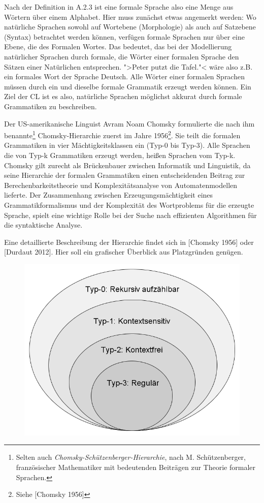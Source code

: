 \documentclass[12pt,a4paper]{article}
\theoremstyle{definition}
\begin{document}
		Nach der Definition in A.2.3 ist eine formale Sprache also eine Menge aus Wörtern über einem Alphabet. Hier muss zunächst etwas angemerkt werden: Wo natürliche Sprachen sowohl auf Wortebene (Morphologie) als auch auf Satzebene (Syntax) betrachtet werden können, verfügen formale Sprachen nur über eine Ebene, die des Formalen Wortes. Das bedeutet, das bei der Modellierung natürlicher Sprachen durch formale, die Wörter einer formalen Sprache den Sätzen einer Natürlichen entsprechen. ">Peter putzt die Tafel."< wäre also z.B. ein formales Wort der Sprache Deutsch. Alle Wörter einer formalen Sprachen müssen durch ein und dieselbe formale Grammatik erzeugt werden können. Ein Ziel der CL ist es also, natürliche Sprachen möglichst akkurat durch formale Grammatiken zu beschreiben.

		Der US-amerikanische Linguist Avram Noam Chomsky formulierte die nach ihm benannte\footnote{Selten auch \emph{Chomsky-Schützenberger-Hierarchie}, nach M. Schützenberger, französischer Mathematiker mit bedeutenden Beiträgen zur Theorie formaler Sprachen.} Chomsky-Hierarchie zuerst im Jahre 1956\footnote{Siehe [Chomsky 1956]}. Sie teilt die formalen Grammatiken in vier Mächtigkeitsklassen ein (Typ-0 bis Typ-3). Alle Sprachen die von Typ-k Grammatiken erzeugt werden, heißen Sprachen vom Typ-k. Chomsky gilt zurecht als Brückenbauer zwischen Informatik und Linguistik, da seine Hierarchie der formalen Grammatiken einen entscheidenden Beitrag zur Berechenbarkeitstheorie und Komplexitätsanalyse von Automatenmodellen lieferte. Der Zusammenhang zwischen Erzeugungsmächtigkeit eines Grammatikformalismus und der Komplexität des Wortproblems für die erzeugte Sprache, spielt eine wichtige Rolle bei der Suche nach effizienten Algorithmen für die syntaktische Analyse.

		Eine detaillierte Beschreibung der Hierarchie findet sich in [Chomsky 1956] oder [Durdaut 2012]. Hier soll ein grafischer Überblick aus Platzgründen genügen.
		\begin{figure}[hbtp]
		\centering
		\includegraphics[width=\linewidth]{Grafiken/Chomsky-Hierarchie}
		\end{figure}
	
\end{document}
